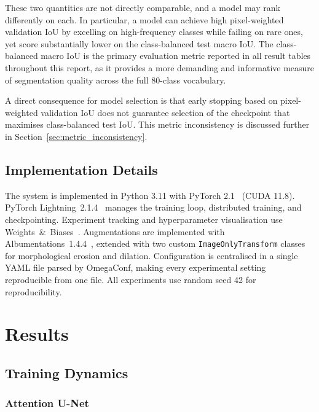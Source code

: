 \documentclass[a4paper,11pt]{article}
\begin{document}
These two quantities are not directly comparable, and a model may rank differently on
each. In particular, a model can achieve high pixel-weighted validation IoU by excelling
on high-frequency classes while failing on rare ones, yet score substantially lower on the
class-balanced test macro IoU. The class-balanced macro IoU is the primary evaluation
metric reported in all result tables throughout this report, as it provides a more
demanding and informative measure of segmentation quality across the full 80-class
vocabulary.

A direct consequence for model selection is that early stopping based on pixel-weighted
validation IoU does not guarantee selection of the checkpoint that maximises
class-balanced test IoU. This metric inconsistency is discussed further in
Section~\ref{sec:metric_inconsistency}.

\subsection{Implementation Details}

The system is implemented in Python 3.11 with PyTorch 2.1~\cite{paszke2019} (CUDA 11.8).
PyTorch Lightning~2.1.4~\cite{falcon2019} manages the training loop, distributed
training, and checkpointing. Experiment tracking and hyperparameter visualisation use
Weights~\&~Biases~\cite{wandb2020}. Augmentations are implemented with
Albumentations~1.4.4~\cite{albumentations2020}, extended with two custom
\texttt{ImageOnlyTransform} classes for morphological erosion and dilation. Configuration
is centralised in a single YAML file parsed by OmegaConf, making every experimental
setting reproducible from one file. All experiments use random seed 42 for
reproducibility.

\section{Results}
\label{sec:results}

\subsection{Training Dynamics}

\subsubsection{Attention U-Net}
\end{document}
